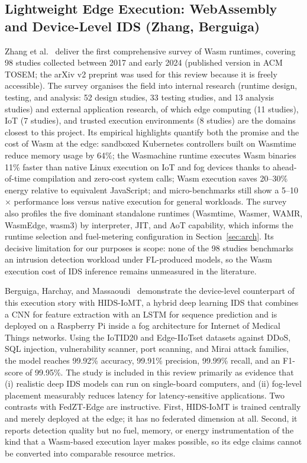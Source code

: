 \documentclass[11pt,a4paper]{article}
\begin{document}
\subsection{Lightweight Edge Execution: WebAssembly and Device-Level IDS
(Zhang, Berguiga)}\label{sec:wasm}

Zhang et al.~\cite{zhang2025} deliver the first comprehensive survey of
Wasm runtimes, covering 98 studies collected between 2017 and early 2024
(published version in ACM TOSEM; the arXiv v2 preprint was used for this
review because it is freely accessible). The survey organises the field
into internal research (runtime design, testing, and analysis: 52 design
studies, 33 testing studies, and 13 analysis studies) and external
application research, of which edge computing (11 studies), IoT (7
studies), and trusted execution environments (8 studies) are the domains
closest to this project. Its empirical highlights quantify both the promise
and the cost of Wasm at the edge: sandboxed Kubernetes controllers built on
Wasmtime reduce memory usage by 64\%; the Wasmachine runtime executes
Wasm binaries 11\% faster than native Linux execution on IoT and fog
devices thanks to ahead-of-time compilation and zero-cost system calls;
Wasm execution saves 20--30\% energy relative to equivalent JavaScript;
and micro-benchmarks still show a 5--10$\times$ performance loss versus
native execution for general workloads. The survey also profiles the five
dominant standalone runtimes (Wasmtime, Wasmer, WAMR, WasmEdge, wasm3) by
interpreter, JIT, and AoT capability, which informs the runtime selection
and fuel-metering configuration in Section~\ref{sec:arch}. Its decisive
limitation for our purposes is scope: none of the 98 studies benchmarks an
intrusion detection workload under FL-produced models, so the Wasm
execution cost of IDS inference remains unmeasured in the literature.

Berguiga, Harchay, and Massaoudi~\cite{berguiga2025} demonstrate the
device-level counterpart of this execution story with HIDS-IoMT, a hybrid
deep learning IDS that combines a CNN for feature extraction with an LSTM
for sequence prediction and is deployed on a Raspberry Pi inside a fog
architecture for Internet of Medical Things networks. Using the IoTID20
and Edge-IIoTset datasets against DDoS, SQL injection, vulnerability
scanner, port scanning, and Mirai attack families, the model reaches
99.92\% accuracy, 99.91\% precision, 99.99\% recall, and an F1-score of
99.95\%. The study is included in this review primarily as evidence that
(i) realistic deep IDS models can run on single-board computers, and (ii)
fog-level placement measurably reduces latency for latency-sensitive
applications. Two contrasts with FedZT-Edge are instructive. First,
HIDS-IoMT is trained centrally and merely deployed at the edge; it has no
federated dimension at all. Second, it reports detection quality but no
fuel, memory, or energy instrumentation of the kind that a Wasm-based
execution layer makes possible, so its edge claims cannot be converted
into comparable resource metrics.
\end{document}
